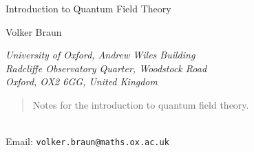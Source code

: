 \begin{titlepage}
  \vspace*{-2cm}
  \VersionInformation
  \hfill
  \parbox[c]{5cm}{
    \begin{flushright}
    \end{flushright}
  }
  \vspace*{2cm}
  \begin{center}
    \Huge 
    Introduction to Quantum Field Theory
  \end{center}
  \vspace*{8mm}
  \begin{center}
    \begin{minipage}{\textwidth}
      \begin{center}
        \sc 
        Volker Braun
      \end{center}
      \begin{center}
        \textit{
          University of Oxford, Andrew Wiles Building\\
          Radcliffe Observatory Quarter, Woodstock Road\\
          Oxford, OX2 6GG, United Kingdom
        }
      \end{center}
    \end{minipage}
  \end{center}
  \vspace*{\stretch1}
  \begin{abstract}
    Notes for the introduction to quantum field theory.
  \end{abstract}
  \vspace*{\stretch1}
  \begin{minipage}{\textwidth}
    \underline{\hspace{5cm}}\\
    Email: \texttt{volker.braun@maths.ox.ac.uk}
  \end{minipage}
\end{titlepage}
\tableofcontents
\listoffigures 	%
\listoftables 	%




